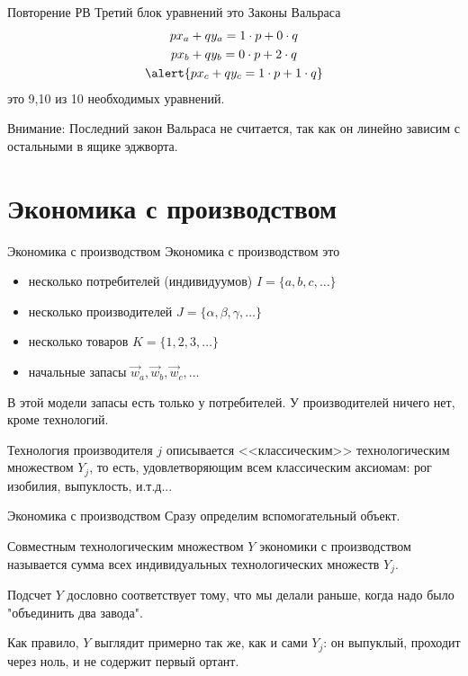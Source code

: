 \documentclass{beamer}
\begin{document}
\begin{frame}{Повторение РВ}
Третий блок уравнений это Законы Вальраса
\begin{gather*}
	p x_a + q y_a = 1 \cdot p + 0  \cdot  q\\
	p x_b + q y_b = 0 \cdot p + 2 \cdot q \\
	\alert{p x_c + q y_c = 1 \cdot p + 1  \cdot q}
\end{gather*}
это 9,10 из 10 необходимых уравнений.

\alert{Внимание:} Последний закон Вальраса не считается, так как он линейно зависим с остальными в ящике эджворта.
\end{frame}

\section{Экономика с производством}
\begin{frame}{Экономика с производством}
\alert{Экономика с производством} это

\begin{itemize}
  \item несколько потребителей (индивидуумов) $I = \{ a,b,c, \ldots\}$
  \item несколько производителей $J = \{ \alpha, \beta, \gamma, \ldots\}$
  \item несколько товаров $K = \{1, 2, 3, \ldots\}$
  \item начальные запасы $\vec w_{a}, \vec w_{b}, \vec w_{c}, \ldots$
\end{itemize}

В этой модели запасы есть только у потребителей. У производителей ничего нет, кроме технологий.

Технология производителя $j$ описывается <<классическим>> технологическим множеством $Y_j$, то есть, удовлетворяющим всем классическим аксиомам: рог изобилия, выпуклость, и.т.д...

\end{frame}

\begin{frame}{Экономика с производством}
Сразу определим вспомогательный объект.

\alert{Совместным технологическим множеством} $Y$ экономики с производством называется сумма всех индивидуальных технологических множеств $Y_j$.

Подсчет $Y$ дословно соответствует тому, что мы делали раньше, когда надо было "объединить два завода". 

Как правило, $Y$ выглядит примерно так же, как и сами $Y_j$: он выпуклый, проходит через ноль, и не содержит первый ортант.
\end{frame}
\end{document}
